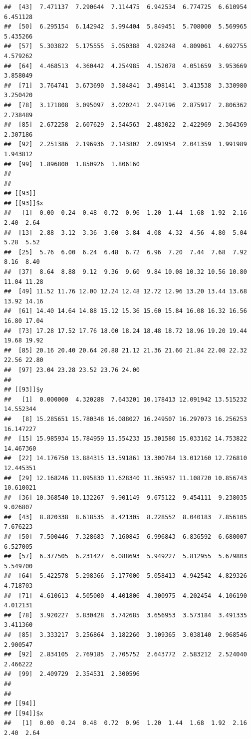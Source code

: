 \documentclass[
  ignorenonframetext,
]{beamer}
\begin{document}
\begin{frame}[fragile]{}
\begin{verbatim}
##  [43]  7.471137  7.290644  7.114475  6.942534  6.774725  6.610954  6.451128
##  [50]  6.295154  6.142942  5.994404  5.849451  5.708000  5.569965  5.435266
##  [57]  5.303822  5.175555  5.050388  4.928248  4.809061  4.692755  4.579262
##  [64]  4.468513  4.360442  4.254985  4.152078  4.051659  3.953669  3.858049
##  [71]  3.764741  3.673690  3.584841  3.498141  3.413538  3.330980  3.250420
##  [78]  3.171808  3.095097  3.020241  2.947196  2.875917  2.806362  2.738489
##  [85]  2.672258  2.607629  2.544563  2.483022  2.422969  2.364369  2.307186
##  [92]  2.251386  2.196936  2.143802  2.091954  2.041359  1.991989  1.943812
##  [99]  1.896800  1.850926  1.806160
## 
## 
## [[93]]
## [[93]]$x
##   [1]  0.00  0.24  0.48  0.72  0.96  1.20  1.44  1.68  1.92  2.16  2.40  2.64
##  [13]  2.88  3.12  3.36  3.60  3.84  4.08  4.32  4.56  4.80  5.04  5.28  5.52
##  [25]  5.76  6.00  6.24  6.48  6.72  6.96  7.20  7.44  7.68  7.92  8.16  8.40
##  [37]  8.64  8.88  9.12  9.36  9.60  9.84 10.08 10.32 10.56 10.80 11.04 11.28
##  [49] 11.52 11.76 12.00 12.24 12.48 12.72 12.96 13.20 13.44 13.68 13.92 14.16
##  [61] 14.40 14.64 14.88 15.12 15.36 15.60 15.84 16.08 16.32 16.56 16.80 17.04
##  [73] 17.28 17.52 17.76 18.00 18.24 18.48 18.72 18.96 19.20 19.44 19.68 19.92
##  [85] 20.16 20.40 20.64 20.88 21.12 21.36 21.60 21.84 22.08 22.32 22.56 22.80
##  [97] 23.04 23.28 23.52 23.76 24.00
## 
## [[93]]$y
##   [1]  0.000000  4.320288  7.643201 10.178413 12.091942 13.515232 14.552344
##   [8] 15.285651 15.780348 16.088027 16.249507 16.297073 16.256253 16.147227
##  [15] 15.985934 15.784959 15.554233 15.301580 15.033162 14.753822 14.467360
##  [22] 14.176750 13.884315 13.591861 13.300784 13.012160 12.726810 12.445351
##  [29] 12.168246 11.895830 11.628340 11.365937 11.108720 10.856743 10.610021
##  [36] 10.368540 10.132267  9.901149  9.675122  9.454111  9.238035  9.026807
##  [43]  8.820338  8.618535  8.421305  8.228552  8.040183  7.856105  7.676223
##  [50]  7.500446  7.328683  7.160845  6.996843  6.836592  6.680007  6.527005
##  [57]  6.377505  6.231427  6.088693  5.949227  5.812955  5.679803  5.549700
##  [64]  5.422578  5.298366  5.177000  5.058413  4.942542  4.829326  4.718703
##  [71]  4.610613  4.505000  4.401806  4.300975  4.202454  4.106190  4.012131
##  [78]  3.920227  3.830428  3.742685  3.656953  3.573184  3.491335  3.411360
##  [85]  3.333217  3.256864  3.182260  3.109365  3.038140  2.968546  2.900547
##  [92]  2.834105  2.769185  2.705752  2.643772  2.583212  2.524040  2.466222
##  [99]  2.409729  2.354531  2.300596
## 
## 
## [[94]]
## [[94]]$x
##   [1]  0.00  0.24  0.48  0.72  0.96  1.20  1.44  1.68  1.92  2.16  2.40  2.64

\end{verbatim}
\end{frame}
\end{document}
